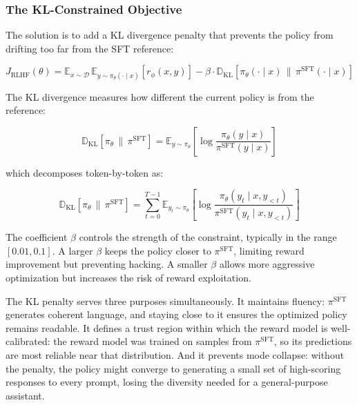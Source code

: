 \documentclass{book}
\begin{document}
\subsubsection{The KL-Constrained Objective}
\label{sec:kl_constraint}

The solution is to add a KL divergence penalty that prevents the policy
from drifting too far from the SFT reference:

\begin{equation}
\label{eq:rlhf_objective}
J_{\text{RLHF}}(\theta)
= \mathbb{E}_{x \sim \mathcal{D}}\,
    \mathbb{E}_{y \sim \pi_\theta(\cdot \mid x)}
    [r_\phi(x, y)]
    - \beta \cdot \mathbb{D}_{\text{KL}}
    [\pi_\theta(\cdot \mid x) \,\|\, \pi^{\text{SFT}}(\cdot \mid x)]
\end{equation}

The KL divergence measures how different the current policy is from the
reference:

\begin{equation}
\label{eq:kl_divergence}
\mathbb{D}_{\text{KL}}[\pi_\theta \,\|\, \pi^{\text{SFT}}]
= \mathbb{E}_{y \sim \pi_\theta}
    \left[ \log \frac{\pi_\theta(y \mid x)}{\pi^{\text{SFT}}(y \mid x)} \right]
\end{equation}

which decomposes token-by-token as:

\begin{equation}
\label{eq:kl_tokenwise}
\mathbb{D}_{\text{KL}}[\pi_\theta \,\|\, \pi^{\text{SFT}}]
= \sum_{t=0}^{T-1} \mathbb{E}_{y_t \sim \pi_\theta}
    \left[ \log \frac{\pi_\theta(y_t \mid x, y_{<t})}
                     {\pi^{\text{SFT}}(y_t \mid x, y_{<t})} \right]
\end{equation}

The coefficient $\beta$ controls the strength of the constraint, typically
in the range $[0.01, 0.1]$. A larger $\beta$ keeps the policy closer to
$\pi^{\text{SFT}}$, limiting reward improvement but preventing hacking. A
smaller $\beta$ allows more aggressive optimization but increases the risk
of reward exploitation.

The KL penalty serves three purposes simultaneously. It maintains fluency:
$\pi^{\text{SFT}}$ generates coherent language, and staying close to it
ensures the optimized policy remains readable. It defines a trust region
within which the reward model is well-calibrated: the reward model was
trained on samples from $\pi^{\text{SFT}}$, so its predictions are most
reliable near that distribution. And it prevents mode collapse: without
the penalty, the policy might converge to generating a small set of
high-scoring responses to every prompt, losing the diversity needed for
a general-purpose assistant.
\end{document}
